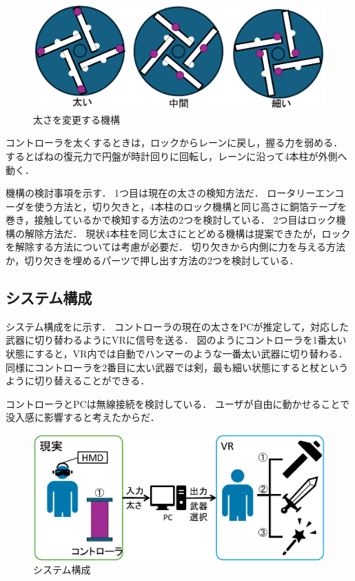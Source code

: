 \documentclass[uplatex]{jsarticle}
\begin{document}
\begin{figure}[htbp]
    \centering
    \includegraphics[width=0.9\linewidth]{fig/太さ3段階.png}
    \caption{太さを変更する機構}
    \label{fig:SlashGear}
\end{figure}

コントローラを太くするときは，ロックからレーンに戻し，握る力を弱める．
するとばねの復元力で円盤が時計回りに回転し，レーンに沿って4本柱が外側へ動く．

機構の検討事項を示す．
1つ目は現在の太さの検知方法だ．
ロータリーエンコーダを使う方法と，切り欠きと，4本柱のロック機構と同じ高さに銅箔テープを巻き，接触しているかで検知する方法の2つを検討している．
2つ目はロック機構の解除方法だ．
現状4本柱を同じ太さにとどめる機構は提案できたが，ロックを解除する方法については考慮が必要だ．
切り欠きから内側に力を与える方法か，切り欠きを埋めるパーツで押し出す方法の2つを検討している．

\subsection{システム構成}

システム構成をに示す．
コントローラの現在の太さをPCが推定して，対応した武器に切り替わるようにVRに信号を送る．
図のようにコントローラを1番太い状態にすると，VR内では自動でハンマーのような一番太い武器に切り替わる．
同様にコントローラを2番目に太い武器では剣，最も細い状態にすると杖というように切り替えることができる．

コントローラとPCは無線接続を検討している．
ユーザが自由に動かせることで没入感に影響すると考えたからだ．

\begin{figure}
    \centering
    \includegraphics[width=0.9\linewidth]{fig/構成図.png}
    \caption{システム構成}
    \label{fig:system}
\end{figure}
\end{document}
